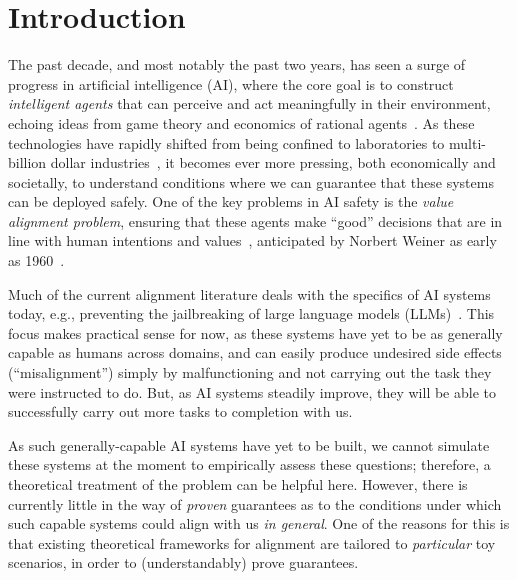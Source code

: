 \section{Introduction}
\label{sec:introduction}
The past decade, and most notably the past two years, has seen a surge of progress in artificial intelligence (AI), where the core goal is to construct \emph{intelligent agents} that can perceive and act meaningfully in their environment, echoing ideas from game theory and economics of rational agents~\citep{simon1984models}.
As these technologies have rapidly shifted from being confined to laboratories to multi-billion dollar industries~\citep{USDeptCommerce2023AI}, it becomes ever more pressing, both economically and societally, to understand conditions where we can guarantee that these systems can be deployed safely.
One of the key problems in AI safety is the \emph{value alignment problem}, ensuring that these agents make ``good'' decisions that are in line with human intentions and values~\citep{soares2018value,russell2015research,amodei2016concrete}, anticipated by Norbert Weiner as early as 1960~\citep{wiener1960some}.

Much of the current alignment literature deals with the specifics of AI systems today, e.g., preventing the jailbreaking of large language models (LLMs)~\citep{ji2023ai,guan2024deliberative,hubinger2024sleeper}.
This focus makes practical sense for now, as these systems have yet to be as generally capable as humans across domains, and can easily produce undesired side effects (``misalignment'') simply by malfunctioning and not carrying out the task they were instructed to do.
But, as AI systems steadily improve, they will be able to successfully carry out more tasks to completion with us.

As such generally-capable AI systems have yet to be built, we cannot simulate these systems at the moment to empirically assess these questions; therefore, a theoretical treatment of the problem can be helpful here.
However, there is currently little in the way of \emph{proven} guarantees as to the conditions under which such capable systems could align with us \emph{in general}.
One of the reasons for this is that existing theoretical frameworks for alignment are tailored to \emph{particular} toy scenarios, in order to (understandably) prove guarantees.

